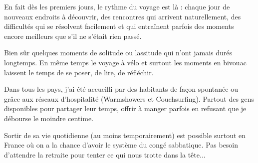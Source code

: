  En fait dès les premiers jours, le rythme du voyage est là : chaque jour de nouveaux endroits à découvrir, des rencontres qui arrivent naturellement, des difficultés qui se résolvent facilement et qui entraînent parfois des moments encore meilleurs que s'il ne s'était rien passé.

 Bien sûr quelques moments de solitude ou lassitude qui n'ont jamais durés longtemps. En même temps le voyage à vélo et surtout les moments en bivouac laissent le temps de se poser, de lire, de réfléchir.

 Dans tous les pays, j'ai été accueilli par des habitants de façon spontanée ou grâce aux réseaux d'hospitalité (Warmshowers et Couchsurfing). Partout des gens disponibles pour partager leur temps, offrir à manger parfois en refusant que je débourse le moindre centime.

 Sortir de sa vie quotidienne (au moins temporairement) est possible surtout en France où on a la chance d'avoir le système du congé sabbatique. Pas besoin d'attendre la retraite pour tenter ce qui nous trotte dans la tête...


 
 
